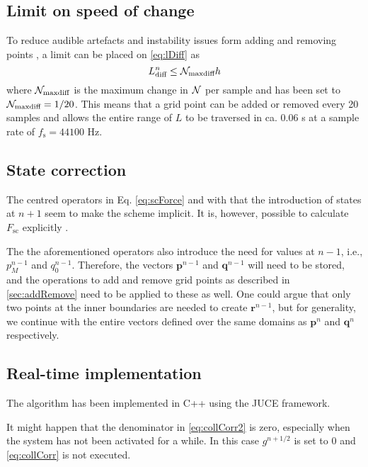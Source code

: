 \subsection{Limit on speed of change}\label{sec:limit}
To reduce audible artefacts and instability issues form adding and removing points , a limit can be placed on \eqref{eq:lDiff} as
\begin{equation}\label{eq:Nmaxdiff} 
    L_\text{diff}^n \leq \mathcal{N}_\text{maxdiff} h
\end{equation}
where $\mathcal{N}_\text{maxdiff}$ is the maximum change in $\mathcal{N}$ per sample and has been set to $\mathcal{N}_\text{maxdiff} = 1/20$. This means that a grid point can be added or removed every 20 samples and allows the entire range of $L$ to be traversed in ca. 0.06 s at a sample rate of $f_\text{s} = 44100$ Hz. 

\subsection{State correction}\label{sec:impStateCorr}
The centred operators in Eq. \eqref{eq:scForce} and with that the introduction of states at $n+1$ seem to make the scheme implicit. It is, however, possible to calculate $F_\text{sc}$ explicitly \cite{bilbao2009, bilbao2009dafx}.

The the aforementioned operators also introduce the need for values at $n-1$, i.e., $p_{M}^{n-1}$ and $q_{0}^{n-1}$. Therefore, the vectors $\mathbf{p}^{n-1}$ and $\mathbf{q}^{n-1}$ will need to be stored, and the operations to add and remove grid points as described in \ref{sec:addRemove} need to be applied to these as well. One could argue that only two points at the inner boundaries are needed to create $\mathbf{r}^{n-1}$, but for generality, we continue with the entire vectors defined over the same domains as $\mathbf{p}^n$ and $\mathbf{q}^{n}$ respectively. 


\subsection{Real-time implementation}
The algorithm has been implemented in C++ using the JUCE framework. 

It might happen that the denominator in \eqref{eq:collCorr2} is zero, especially when the system has not been activated for a while. In this case $g^{n+1/2}$ is set to 0 and \eqref{eq:collCorr} is not executed.

